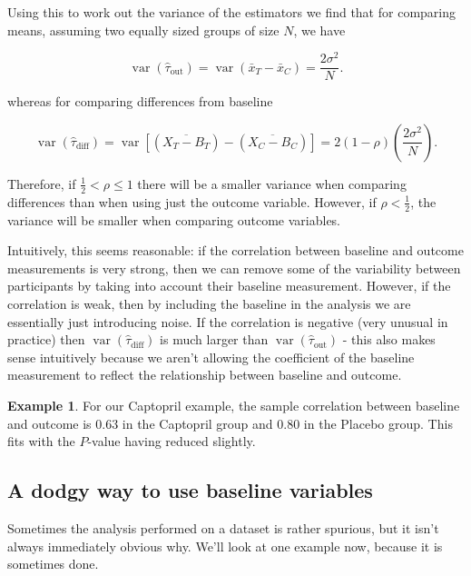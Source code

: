 \documentclass[
  openany]{book}
\theoremstyle{definition}
\theoremstyle{definition}
\newtheorem{example}{Example}[chapter]
\theoremstyle{definition}
\theoremstyle{definition}
\theoremstyle{remark}
\begin{document}
Using this to work out the variance of the estimators we find that for comparing means, assuming two equally sized groups of size \(N\), we have

\[\operatorname{var}\left(\hat{\tau}_{\text{out}}\right) = \operatorname{var}\left(\bar{x}_T - \bar{x}_C\right) = \frac{2\sigma^2}{N}.\]

whereas for comparing differences from baseline

\[\operatorname{var}\left(\hat{\tau}_{\text{diff}}\right) = \operatorname{var}\left[\left(\overline{X_T-B_T}\right) - \left(\overline{X_C - B_C}\right)\right] = 2\left(1-\rho\right)\left(\frac{2\sigma^2}{N}\right).\]

Therefore, if \(\frac{1}{2}<\rho\leq 1\) there will be a smaller variance when comparing differences than when using just the outcome variable. However, if \(\rho<\frac{1}{2}\), the variance will be smaller when comparing outcome variables.

Intuitively, this seems reasonable: if the correlation between baseline and outcome measurements is very strong, then we can remove some of the variability between participants by taking into account their baseline measurement. However, if the correlation is weak, then by including the baseline in the analysis we are essentially just introducing noise. If the correlation is negative (very unusual in practice) then \(\operatorname{var}\left(\hat{\tau}_{\text{diff}}\right)\) is much larger than \(\operatorname{var}\left(\hat{\tau}_{\text{out}}\right)\) - this also makes sense intuitively because we aren't allowing the coefficient of the baseline measurement to reflect the relationship between baseline and outcome.

\begin{example}
For our Captopril example, the sample correlation between baseline and outcome is 0.63 in the Captopril group and 0.80 in the Placebo group. This fits with the \(P\)-value having reduced slightly.
\end{example}

\subsection{A dodgy way to use baseline variables}\label{a-dodgy-way-to-use-baseline-variables}

Sometimes the analysis performed on a dataset is rather spurious, but it isn't always immediately obvious why. We'll look at one example now, because it is sometimes done.
\end{document}

